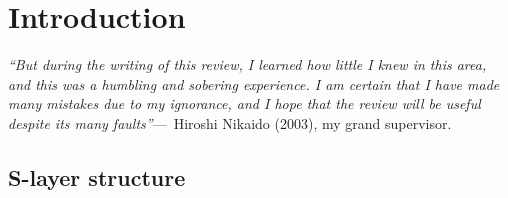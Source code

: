 \acresetall{}

\chapter{Introduction}
\label{ch:Introduction}

    \begin{epigraph}
            \emph{``But during the writing of this review, I learned how little I knew in this area, and this was a humbling and sobering experience. I am certain that I have made many mistakes due to my ignorance, and I hope that the review will be useful despite its many faults''}---~Hiroshi Nikaido (2003), my grand supervisor.
    \end{epigraph}

    \section{S-layer structure} %
    \label{sec:s_layer_structure}


